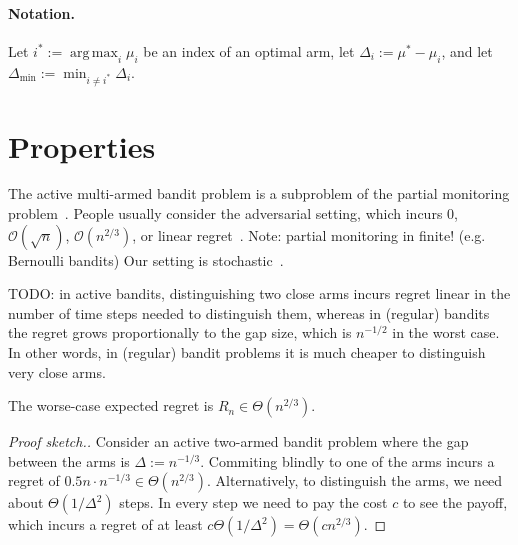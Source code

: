 \documentclass[a4paper]{article}
\DeclareMathOperator*{\argmax}{arg\,max} %
\begin{document}
\paragraph{Notation.}
Let $i^* := \argmax_i \mu_i$ be an index of an optimal arm,
let $\Delta_i := \mu^* - \mu_i$, and
let $\Delta_{\min} := \min_{i \neq i^*} \Delta_i$.



\section{Properties}

The active multi-armed bandit problem is
a subproblem of the partial monitoring problem~\citep{Piccolboni01}.
People usually consider the adversarial setting,
which incurs $0$, $\mathcal{O}(\sqrt{n})$, $\mathcal{O}(n^{2/3})$, or linear regret~\citep{Antos13}.
Note: partial monitoring in finite! (e.g. Bernoulli bandits)
Our setting is stochastic~\citep{Komiyama15}.

TODO: in active bandits, distinguishing two close arms incurs regret linear in the number of time steps needed to distinguish them, whereas in (regular) bandits the regret grows proportionally to the gap size, which is $n^{-1/2}$ in the worst case.
In other words, in (regular) bandit problems it is much cheaper
to distinguish very close arms.

\begin{proposition}
The worse-case expected regret is $R_n \in \Theta(n^{2/3})$.
\end{proposition}
\begin{proof}[Proof sketch.]
Consider an active two-armed bandit problem
where the gap between the arms is $\Delta := n^{-1/3}$.
Commiting blindly to one of the arms incurs a regret of
$0.5n \cdot n^{-1/3} \in \Theta(n^{2/3})$.
Alternatively, to distinguish the arms,
we need about $\Theta(1/\Delta^2)$ steps.
In every step we need to pay the cost $c$ to see the payoff,
which incurs a regret of
at least $c\Theta(1/\Delta^2) = \Theta(cn^{2/3})$.
\end{proof}
\end{document}
